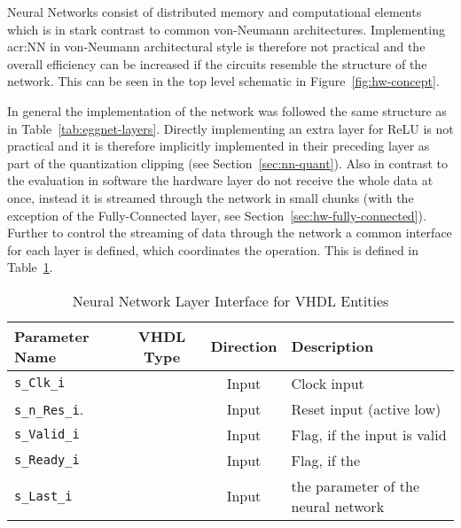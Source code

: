 
Neural Networks consist of distributed memory and computational elements which is in stark contrast to common von-Neumann architectures. Implementing \gls{acr:NN} in von-Neumann architectural style is therefore not practical and the overall efficiency can be increased if the circuits resemble the structure of the network. This can be seen in the top level schematic in Figure~\ref{fig:hw-concept}.

In general the implementation of the network was followed the same structure as in Table~\ref{tab:eggnet-layers}. Directly implementing an extra layer for ReLU is not practical and it is therefore implicitly implemented in their preceding layer as part of the quantization clipping (see Section~\ref{sec:nn-quant}). Also in contrast to the evaluation in software the hardware layer do not receive the whole data at once, instead it is streamed through the network in small chunks (with the exception of the Fully-Connected layer, see Section~\ref{sec:hw-fully-connected}). Further to control the streaming of data through the network a common interface for each layer is defined, which coordinates the operation. This is defined in Table~\ref{tab:hw-layer-interface}. 

\begin{table}[h!]
\centering	
\begin{tabular}{l|ccl}
	\toprule
	Parameter Name 		   	   & VHDL Type  & Direction & Description 								\\
	\midrule
	\texttt{s\_Clk\_i} 	       & \stdlogic  & Input 	    & Clock input								\\
	\texttt{s\_n\_Res\_i}.     & \stdlogic  & Input 	    & Reset input (active low)					\\
	\texttt{s\_Valid\_i} 	   & \stdlogic  & Input 	    & Flag, if the input is valid				\\
	\texttt{s\_Ready\_i} 	   & \stdlogic  & Input 	    & Flag, if the 								\\
	\texttt{s\_Last\_i} 	   & \stdlogic  & Input 	    & the parameter of the neural network		\\
	\bottomrule
\end{tabular}
\caption{Neural Network Layer Interface for VHDL Entities}
\label{tab:hw-layer-interface}
\end{table}

